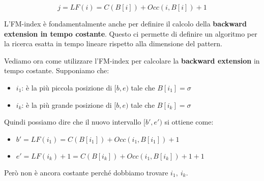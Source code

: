 \begin{equation}
    j = LF(i) = C(B[i]) + Occ(i, B[i]) + 1
\end{equation}

L'FM-index è fondamentalmente anche per definire il calcolo della \textbf{backward extension in
    tempo costante}. Questo ci permette di definire un algoritmo per la ricerca esatta
in tempo lineare rispetto alla dimensione del pattern.

Vediamo ora come utilizzare l'FM-index per calcolare la \textbf{backward
    extension} in tempo costante. Supponiamo che:
\begin{itemize}
    \item $i_1$: è la più piccola posizione di $[b,e)$ tale che $B[i_1]=\sigma$
    \item $i_k$: è la più grande posizione di $[b,e)$ tale che $B[i_k]=\sigma$
\end{itemize}
Quindi possiamo dire che il nuovo intervallo $[b',e')$ si ottiene come:
\begin{itemize}
    \item $b' = LF(i_1) = C(B[i_1]) + Occ(i_1,B[i_1])+1$
    \item $e' = LF(i_k) + 1 = C(B[i_k]) + Occ(i_1,B[i_k]) + 1 + 1$
\end{itemize}
Però non è ancora costante perché dobbiamo trovare $i_1, \ i_k$.

